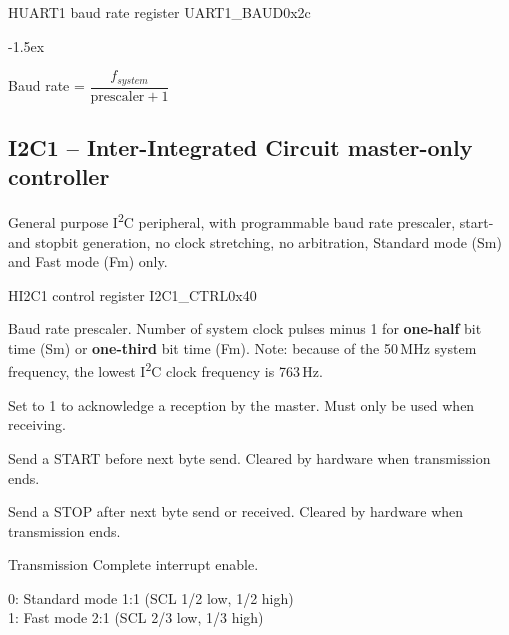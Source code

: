 \documentclass[12pt]{article}
\begin{document}
\begin{register}{H}{UART1 baud rate register UART1\_BAUD}{0x2c}
\label{uart1baud}
%
%
\regnewline%
\end{register}
\begin{regdesc}[0.6\textwidth]\begin{reglist}[000000000]
\itemsep-1.5ex
\item[Prescaler] Baud rate = $\dfrac{f_{system}}{\textrm{prescaler}+1}$
\end{reglist}\end{regdesc}


\subsection{I2C1 -- Inter-Integrated Circuit master-only controller}
General purpose I\textsuperscript{2}C peripheral, with programmable baud rate prescaler, start- and stopbit generation, no clock stretching, no arbitration, Standard mode (Sm) and Fast mode (Fm) only.

\begin{register}{H}{I2C1 control register I2C1\_CTRL}{0x40}
\label{i2c1ctrl}
%
%
%
%
%
%
%
%
%
\regnewline%
\end{register}
\begin{regdesc}[0.8\textwidth]\begin{reglist}[0000000i]
\item [BAUD] Baud rate prescaler. Number of system clock pulses minus 1 for \textbf{one-half} bit time (Sm) or \textbf{one-third} bit time (Fm).
Note: because of the 50\,MHz system frequency, the lowest I\textsuperscript{2}C clock frequency is 763\,Hz.
\item [MACK] Set to 1 to acknowledge a reception by the master. Must only be used when receiving.
\item [START] Send a START before next byte send. Cleared by hardware when transmission ends.
\item [STOP] Send a STOP after next byte send or received. Cleared by hardware when transmission ends.
\item [TCIE] Transmission Complete interrupt enable.
\item [FM] 0: Standard mode 1:1 (SCL 1/2 low, 1/2 high)\\1: Fast mode 2:1 (SCL 2/3 low, 1/3 high)
\end{reglist}\end{regdesc}
\end{document}
